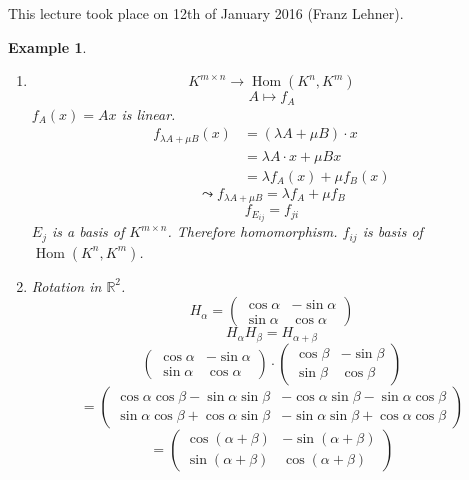 \documentclass[a4paper,landscape,twocolumn]{article}
\newcommand\meta[3]{This #1 took place on #2 (#3).\par}
\newtheorem{ex}{Example}
\DeclareMathOperator\Hom{Hom} %
\begin{document}
\meta{lecture}{12th of January 2016}{Franz Lehner}

\begin{ex}
  \begin{enumerate}
    \item[3.]
      \[ K^{m\times n} \to \Hom(K^n, K^m) \]
      \[ A \mapsto f_A \]
      $f_A(x) = Ax$ is linear.
      \begin{align*}
        f_{\lambda A + \mu B}(x) &= (\lambda A + \mu B) \cdot x \\
          &= \lambda A \cdot x + \mu B x \\
          &= \lambda f_A(x) + \mu f_B(x)
      \end{align*}
      \[ \leadsto f_{\lambda A + \mu B} = \lambda f_A + \mu f_B \]
      \[ f_{E_{ij}} = f_{ji} \]
      $E_j$ is a basis of $K^{m\times n}$. Therefore homomorphism.
      $f_{ij}$ is basis of $\Hom(K^n, K^m)$.
    \item[4.] Rotation in $\mathbb R^2$.
      \[
        H_\alpha = \begin{pmatrix}
          \cos{\alpha} & -\sin{\alpha} \\
          \sin{\alpha} & \cos{\alpha}
        \end{pmatrix}
      \]
      \[ H_\alpha H_\beta = H_{\alpha + \beta} \]
      \[
        \begin{pmatrix}
          \cos{\alpha} & -\sin{\alpha} \\
          \sin{\alpha} & \cos{\alpha}
        \end{pmatrix} \cdot
        \begin{pmatrix}
          \cos{\beta} & -\sin{\beta} \\
          \sin{\beta} & \cos{\beta}
        \end{pmatrix}
      \] \[
        =
        \begin{pmatrix}
          \cos{\alpha} \cos{\beta} - \sin{\alpha} \sin{\beta} & -\cos{\alpha} \sin{\beta} - \sin{\alpha} \cos{\beta} \\
          \sin{\alpha} \cos{\beta} + \cos{\alpha} \sin{\beta} & -\sin{\alpha} \sin{\beta} + \cos{\alpha} \cos{\beta}
        \end{pmatrix}
      \] \[
        = \begin{pmatrix}
          \cos(\alpha + \beta) & -\sin(\alpha + \beta) \\
          \sin(\alpha + \beta) & \cos(\alpha + \beta)
        \end{pmatrix}
      \]
  \end{enumerate}
\end{ex}
\end{document}

